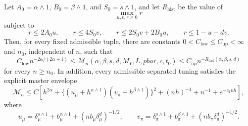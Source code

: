 Let \(A_0=\alpha\wedge1\), \(B_0=\beta\wedge1\), and \(S_0=s\wedge1\), and let \(R_{\mathrm{hist}}\) be the value of
\[
\max_{u,v,r\ge0}r
\]
subject to
\[
r\le2A_0u,\qquad r\le4S_0v,\qquad r\le2S_0v+2B_0u,\qquad r\le1-u-dv.
\]
Then, for every fixed admissible tuple, there are constants \(0<C_{\mathrm{low}}\le C_{\mathrm{up}}<\infty\) and \(n_0\), independent of \(n\), such that
\[
C_{\mathrm{low}}n^{-2\alpha/(2\alpha+1)}
\le\mathcal M_n(\alpha,\beta,s,d,M_Y,L,pbar,c,t_0)
\le C_{\mathrm{up}}n^{-R_{\mathrm{hist}}(\alpha,\beta,s,d)}
\]
for every \(n\ge n_0\). In addition, every admissible separated tuning satisfies the explicit master envelope
\[
\mathcal M_n\le C\left[h^{2\alpha}+\{(u_\mu+h^{\alpha\wedge1})(v_\pi+h^{\beta\wedge1})\}^2+(nh)^{-1}+n^{-1}+e^{-c_1nh}\right],
\]
where
\[
u_\mu=\delta_\mu^{s\wedge1}+b_\mu^{\alpha\wedge1}+(nb_\mu\delta_\mu^d)^{-1/2},
\qquad
v_\pi=\delta_\pi^{s\wedge1}+b_\pi^{\beta\wedge1}+(nb_\pi\delta_\pi^d)^{-1/2}.
\]
